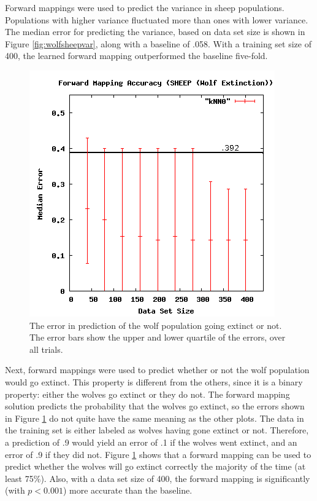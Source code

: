 Forward mappings were used to predict the variance in sheep populations.
Populations with higher variance fluctuated more than ones with lower variance.
The median error for predicting the variance, based on data set size is shown in Figure \ref{fig:wolfsheepvar}, along with a baseline of .058.
With a training set size of 400, the learned forward mapping outperformed the baseline five-fold.

\begin{figure}[ht]
\centering
\includegraphics[scale=.5]{images/results_wolfsheep/fm-wolf-extict.png}
\caption{The error in prediction of the wolf population going extinct or not.
The error bars show the upper and lower quartile of the errors, over all trials.}
\label{fig:wolfsheepextinct}
\end{figure}

Next, forward mappings were used to predict whether or not the wolf population would go extinct.
This property is different from the others, since it is a binary property: either the wolves go extinct or they do not.
The forward mapping solution predicts the probability that the wolves go extinct, so the errors shown in Figure \ref{fig:wolfsheepextinct} do not quite have the same meaning as the other plots.
The data in the training set is either labeled as wolves having gone extinct or not.
Therefore, a prediction of .9 would yield an error of .1 if the wolves went extinct, and an error of .9 if they did not.
Figure \ref{fig:wolfsheepextinct} shows that a forward mapping can be used to predict whether the wolves will go extinct correctly the majority of the time (at least 75\%).
Also, with a data set size of 400, the forward mapping is significantly (with $p < 0.001$) more accurate than the baseline.

